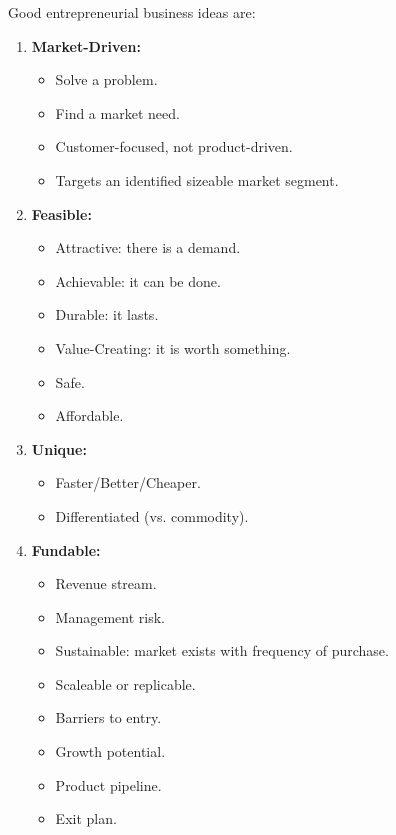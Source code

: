 \documentclass[a4paper,11pt]{article}
\begin{document}
Good entrepreneurial business ideas are:
\begin{enumerate}
    \item   \textbf{Market-Driven:}
            \begin{itemize}
                \item   Solve a problem.
                \item   Find a market need.
                \item   Customer-focused, not product-driven.
                \item   Targets an identified sizeable market segment.
            \end{itemize}
    \item   \textbf{Feasible:}
            \begin{itemize}
                \item   Attractive: there is a demand.
                \item   Achievable: it can be done.
                \item   Durable: it lasts.
                \item   Value-Creating: it is worth something.
                \item   Safe.
                \item   Affordable.
            \end{itemize}
    \item   \textbf{Unique:}
            \begin{itemize}
                \item   Faster/Better/Cheaper.
                \item   Differentiated (vs. commodity).
            \end{itemize}
    \item   \textbf{Fundable:}
            \begin{itemize}
                \item   Revenue stream.
                \item   Management risk.
                \item   Sustainable: market exists with frequency of purchase.
                \item   Scaleable or replicable.
                \item   Barriers to entry.
                \item   Growth potential.
                \item   Product pipeline.
                \item   Exit plan.

\end{itemize}
\end{enumerate}
\end{document}
